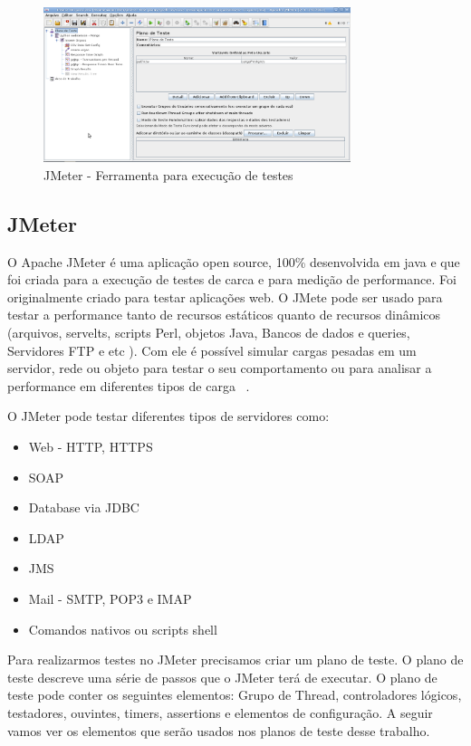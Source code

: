 	\begin{figure}[!htbp]
		\begin{center}
			\includegraphics[width=0.8\textwidth]{jmeter}
		\end{center}
		\caption{JMeter - Ferramenta para execução de testes ~\cite{siteJmeter}}
		\label{fig:jmeter}
	\end{figure}


\subsection{JMeter}

O Apache JMeter é uma aplicação open source, 100\% desenvolvida em java e que foi criada para a execução de testes de carca e para medição de performance. Foi originalmente criado para testar aplicações web. O JMete pode ser usado para testar a performance tanto de recursos estáticos quanto de recursos dinâmicos  (arquivos, servelts, scripts Perl, objetos Java, Bancos de dados e queries, Servidores FTP e etc ). Com ele é possível simular cargas pesadas em um servidor, rede ou objeto para testar o seu comportamento ou para analisar a performance em diferentes tipos de carga ~\cite{siteJmeter}.

O JMeter pode testar diferentes tipos de servidores como:

\begin{itemize}
\item Web - HTTP, HTTPS
\item SOAP
\item Database via JDBC
\item LDAP
\item JMS
\item Mail - SMTP, POP3 e IMAP
\item Comandos nativos ou scripts shell
\end{itemize}

Para realizarmos testes no JMeter precisamos criar um plano de teste. O plano de teste descreve uma série de passos que o JMeter terá de executar. O plano de teste pode conter os seguintes elementos: Grupo de Thread, controladores lógicos, testadores, ouvintes, timers, assertions e elementos de configuração. A seguir vamos ver os elementos que serão usados nos planos de teste desse trabalho.

